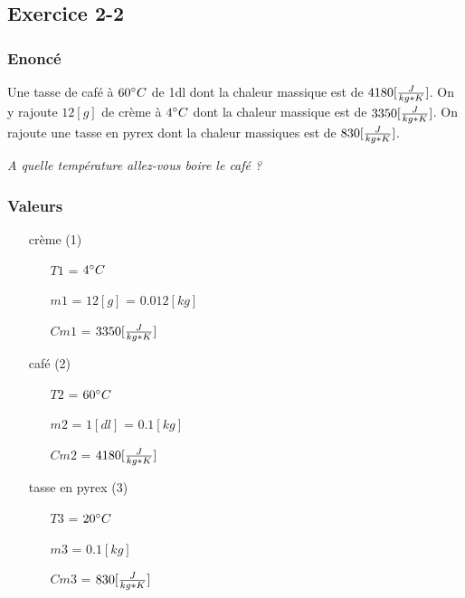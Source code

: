 \subsection{Exercice 2-2}
\subsubsection{Enoncé}
Une tasse de café à $60\celsius$ de 1dl dont la chaleur massique est de $4180[\cm]$. On y rajoute $12[g]$ de crème à $4\celsius$ dont la chaleur massique est de $3350[\cm]$. On rajoute une tasse en pyrex dont la chaleur massiques est de $830[\cm]$.

\textit{A quelle température allez-vous boire le café ?}
\subsubsection{Valeurs}
\begin{itemize}
    \item[crème] (1)
    \item[] 
    \begin{itemize}
        \item[$T1$] = $4\celsius$
        \item[$m1$] = $12[g]$ = $0.012[kg]$
        \item[$Cm1$] = $3350[\cm]$
    \end{itemize} 
    \item[café] (2)
    \item[] 
    \begin{itemize}
        \item[$T2$] = $60\celsius$
        \item[$m2$] = $1[dl]$ = $0.1[kg]$
        \item[$Cm2$] = $4180[\cm]$   
    \end{itemize} 
    \item[tasse en pyrex] (3)
    \item[] 
    \begin{itemize}
        \item[$T3$] = $20\celsius$
        \item[$m3$] = $0.1[kg]$
        \item[$Cm3$] = $830[\cm]$   
    \end{itemize} 
\end{itemize}
